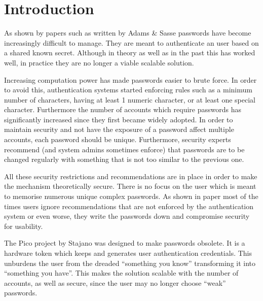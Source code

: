 
\chapter{Introduction} %

\label{Chapter1}


As shown by papers such as \cite{adams1999users} written by Adams \& Sasse passwords have become increasingly difficult to manage. They are meant to authenticate an user based on a shared known secret. Although in theory as well as in the past this has worked well, in practice they are no longer a viable scalable solution. 

Increasing computation power has made passwords easier to brute force. In order to avoid this, authentication systems started enforcing rules such as a minimum number of characters, having at least 1 numeric character, or at least one special character. Furthermore the number of accounts which require passwords has significantly increased since they first became widely adopted. In order to maintain security and not have the exposure of a password affect multiple accounts, each password should be unique. Furthermore, security experts recommend (and system admins sometimes enforce) that passwords are to be changed regularly with something that is not too similar to the previous one.  

All these security restrictions and recommendations are in place in order to make the mechanism theoretically secure. There is no focus on the user which is meant to memorise numerous unique complex passwords. As shown in paper \cite{adams1999users} most of the times users ignore recommendations that are not enforced by the authentication system or even worse, they write the passwords down and compromise security for usability.

The Pico project \cite{stajano2011pico} by Stajano was designed to make passwords obsolete. It is a hardware token which keeps and generates user authentication credentials. This unburdens the user from the dreaded ``something you know'' transforming it into ``something you have''. This makes the solution scalable with the number of accounts, as well as secure, since the user may no longer choose ``weak'' passwords. 

